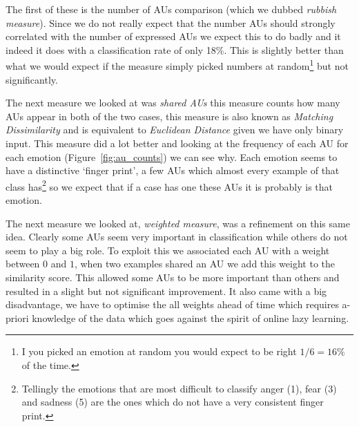 \documentclass[10pt,a4paper]{article}
\begin{document}
The first of these is the number of AUs comparison (which we dubbed \emph{rubbish measure}). Since we do not really expect that the number AUs should strongly correlated with the number of expressed AUs we expect this to do badly and it indeed it does with a classification rate of only 18\%.
This is slightly better than what we would expect if the measure simply picked numbers at random\footnote{I you picked an emotion at random you would expect to be right $1/6 = 16\%$ of the time.} but not significantly.

The next measure we looked at was \emph{shared AUs} this measure counts how many AUs appear in both of the two cases, this measure is also known as \emph{Matching Dissimilarity} and is equivalent to \emph{Euclidean Distance} given we have only binary input. This measure did a lot better and looking at the frequency of each AU for each emotion (Figure~\ref{fig:au_counts}) we can see why. Each emotion seems to have a distinctive `finger print', a few AUs which almost every example of that class has\footnote{Tellingly the emotions that are most difficult to classify anger (1), fear (3) and sadness (5) are the ones which do not have a very consistent finger print.} so we expect that if a case has one these AUs it is probably is that emotion.

The next measure we looked at, \emph{weighted measure}, was a refinement on this same idea.
Clearly some AUs seem very important in classification while others do not seem to play a big role.
To exploit this we associated each AU with a weight between $0$ and $1$, when two examples shared an AU we add this weight to the similarity score. 
This allowed some AUs to be more important than others and resulted in a slight but not significant improvement. 
It also came with a big disadvantage, we have to optimise the all weights ahead of time which requires a-priori knowledge of the data which goes against the spirit of online lazy learning.
\end{document}
